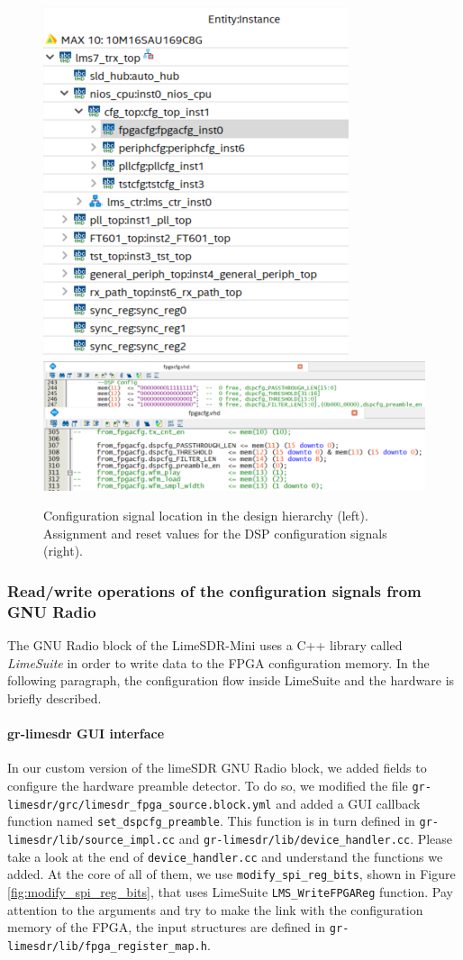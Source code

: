 \begin{figure}[!h]
    \centering
    \includegraphics[width=0.3\linewidth]{figures/design_hierarchy_fpgacfg.PNG}
    \includegraphics[width=0.6\linewidth]{figures/design_hierarchy_fpgacfg_both.PNG}
    \caption{Configuration signal location in the design hierarchy (left). Assignment and reset values for the DSP configuration signals (right).}
    \label{fig:design_hier_fpgacfg}
\end{figure}

\subsubsection{Read/write operations of the configuration signals from GNU Radio}
The GNU Radio block of the LimeSDR-Mini uses a C++ library called \textit{LimeSuite} in order to write data to the FPGA configuration memory. In the following paragraph, the configuration flow inside LimeSuite and the hardware is briefly described.

\begin{sloppypar}
\paragraph{gr-limesdr GUI interface}
In our custom version of the limeSDR GNU Radio block, we added fields to configure the hardware preamble detector. To do so, we modified the file \texttt{gr-limesdr/grc/limesdr\_fpga\_source.block.yml} and added a GUI callback function named \texttt{set\_dspcfg\_preamble}. This function is in turn defined in \texttt{gr-limesdr/lib/source\_impl.cc} and \texttt{gr-limesdr/lib/device\_handler.cc}. Please take a look at the end of \texttt{device\_handler.cc} and understand the functions we added. At the core of all of them, we use \texttt{modify\_spi\_reg\_bits}, shown in Figure \ref{fig:modify_spi_reg_bits}, that uses LimeSuite \texttt{LMS\_WriteFPGAReg} function. Pay attention to the arguments and try to make the link with the configuration memory of the FPGA, the input structures are defined in \texttt{gr-limesdr/lib/fpga\_register\_map.h}.
\end{sloppypar}

